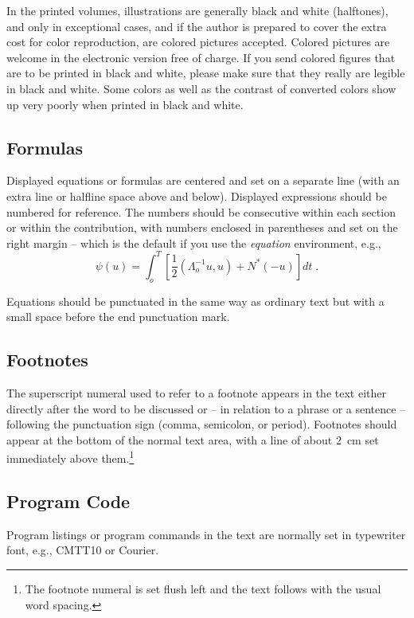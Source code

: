 \documentclass{book}
\begin{document}
In the printed volumes, illustrations are generally black and white
(halftones), and only in exceptional cases, and if the author is
prepared to cover the extra cost for color reproduction, are colored
pictures accepted. Colored pictures are welcome in the electronic
version free of charge. If you send colored figures that are to be
printed in black and white, please make sure that they really are
legible in black and white. Some colors as well as the contrast of
converted colors show up very poorly when printed in black and white.

\subsection{Formulas}

Displayed equations or formulas are centered and set on a separate
line (with an extra line or halfline space above and below). Displayed
expressions should be numbered for reference. The numbers should be
consecutive within each section or within the contribution,
with numbers enclosed in parentheses and set on the right margin --
which is the default if you use the \emph{equation} environment, e.g.,
\begin{equation}
  \psi (u) = \int_{o}^{T} \left[\frac{1}{2}
  \left(\Lambda_{o}^{-1} u,u\right) + N^{\ast} (-u)\right] dt \;  .
\end{equation}

Equations should be punctuated in the same way as ordinary
text but with a small space before the end punctuation mark.

\subsection{Footnotes}

The superscript numeral used to refer to a footnote appears in the text
either directly after the word to be discussed or -- in relation to a
phrase or a sentence -- following the punctuation sign (comma,
semicolon, or period). Footnotes should appear at the bottom of
the
normal text area, with a line of about 2~cm set
immediately above them.\footnote{The footnote numeral is set flush left
and the text follows with the usual word spacing.}

\subsection{Program Code}

Program listings or program commands in the text are normally set in
typewriter font, e.g., CMTT10 or Courier.
\end{document}
